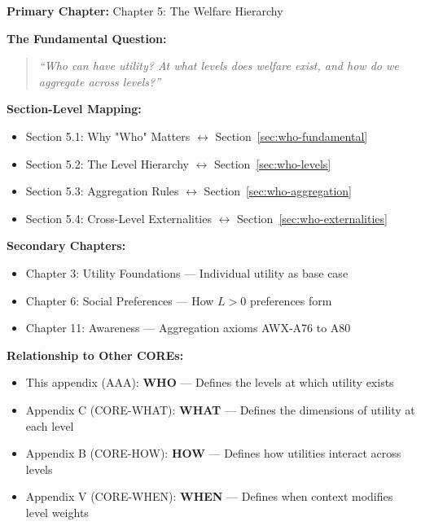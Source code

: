 \begin{tcolorbox}[colback=purple!5!white, colframe=purple!75!black,
    title=Chapter Linkage]

\textbf{Primary Chapter:} Chapter 5: The Welfare Hierarchy

\vspace{0.3em}
\textbf{The Fundamental Question:}
\begin{quote}
\textit{``Who can have utility? At what levels does welfare exist, and how do we aggregate across levels?''}
\end{quote}

\textbf{Section-Level Mapping:}
\begin{itemize}[nosep]
\item Section 5.1: Why "Who" Matters $\leftrightarrow$ Section~\ref{sec:who-fundamental}
\item Section 5.2: The Level Hierarchy $\leftrightarrow$ Section~\ref{sec:who-levels}
\item Section 5.3: Aggregation Rules $\leftrightarrow$ Section~\ref{sec:who-aggregation}
\item Section 5.4: Cross-Level Externalities $\leftrightarrow$ Section~\ref{sec:who-externalities}
\end{itemize}

\textbf{Secondary Chapters:}
\begin{itemize}[nosep]
\item Chapter 3: Utility Foundations --- Individual utility as base case
\item Chapter 6: Social Preferences --- How $L > 0$ preferences form
\item Chapter 11: Awareness --- Aggregation axioms AWX-A76 to A80
\end{itemize}

\textbf{Relationship to Other COREs:}
\begin{itemize}[nosep]
\item This appendix (AAA): \textbf{WHO} --- Defines the levels at which utility exists
\item Appendix C (CORE-WHAT): \textbf{WHAT} --- Defines the dimensions of utility at each level
\item Appendix B (CORE-HOW): \textbf{HOW} --- Defines how utilities interact across levels
\item Appendix V (CORE-WHEN): \textbf{WHEN} --- Defines when context modifies level weights
\end{itemize}

\end{tcolorbox}

